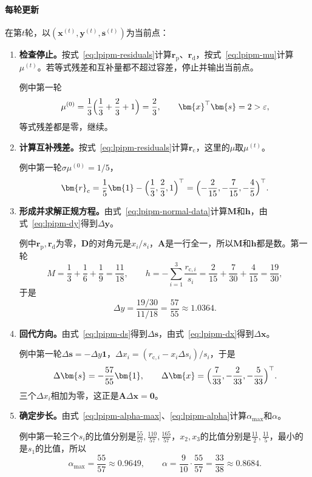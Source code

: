 \paragraph{每轮更新}
在第$t$轮，以$(\bm{x}^{(t)},\bm{y}^{(t)},\bm{s}^{(t)})$为当前点：
\begin{enumerate}
 \item \textbf{检查停止。}按式~\eqref{eq:lpipm-residuals}计算$\bm{r}_{\mathrm{p}}$、$\bm{r}_{\mathrm{d}}$，按式~\eqref{eq:lpipm-mu}计算$\mu^{(t)}$。若等式残差和互补量都不超过容差，停止并输出当前点。

 例中第一轮
 \[
  \mu^{(0)}=\frac13\Bigl(\frac13+\frac23+1\Bigr)=\frac23,\qquad\bm{x}^\top\bm{s}=2>\varepsilon,
 \]
 等式残差都是零，继续。

 \item \textbf{计算互补残差。}按式~\eqref{eq:lpipm-residuals}计算$\bm{r}_{\mathrm{c}}$，这里的$\mu$取$\mu^{(t)}$。

 例中第一轮$\sigma\mu^{(0)}=1/5$，
 \[
  \bm{r}_{\mathrm{c}}=\frac15\bm{1}-\Bigl(\frac13,\frac23,1\Bigr)^\top=\Bigl(-\frac{2}{15},-\frac{7}{15},-\frac45\Bigr)^\top.
 \]

 \item \textbf{形成并求解正规方程。}由式~\eqref{eq:lpipm-normal-data}计算$\bm{M}$和$\bm{h}$，由式~\eqref{eq:lpipm-dy}得到$\Delta\bm{y}$。

 例中$\bm{r}_{\mathrm{p}},\bm{r}_{\mathrm{d}}$为零，$\bm{D}$的对角元是$x_i/s_i$，$\bm{A}$是一行全一，所以$\bm{M}$和$\bm{h}$都是数。第一轮
 \[
  M=\frac13+\frac16+\frac19=\frac{11}{18},\qquad h=-\sum_{i=1}^3\frac{r_{\mathrm{c},i}}{s_i}=\frac{2}{15}+\frac{7}{30}+\frac{4}{15}=\frac{19}{30},
 \]
 于是
 \[
  \Delta y=\frac{19/30}{11/18}=\frac{57}{55}\approx1.0364.
 \]

 \item \textbf{回代方向。}由式~\eqref{eq:lpipm-ds}得到$\Delta\bm{s}$，由式~\eqref{eq:lpipm-dx}得到$\Delta\bm{x}$。

 例中第一轮$\Delta\bm{s}=-\Delta y\bm{1}$，$\Delta x_i=(r_{\mathrm{c},i}-x_i\Delta s_i)/s_i$，于是
 \[
  \Delta\bm{s}=-\frac{57}{55}\bm{1},\qquad
  \Delta\bm{x}=\Bigl(\frac{7}{33},-\frac{2}{33},-\frac{5}{33}\Bigr)^\top.
 \]
 三个$\Delta x_i$相加为零，这正是$\bm{A}\Delta\bm{x}=\bm{0}$。

 \item \textbf{确定步长。}由式~\eqref{eq:lpipm-alpha-max}、\eqref{eq:lpipm-alpha}计算$\alpha_{\max}$和$\alpha$。

 例中第一轮三个$s_i$的比值分别是$\tfrac{55}{57},\tfrac{110}{57},\tfrac{165}{57}$，$x_2,x_3$的比值分别是$\tfrac{11}{2},\tfrac{11}{5}$，最小的是$s_1$的比值，所以
 \[
  \alpha_{\max}=\frac{55}{57}\approx0.9649,\qquad\alpha=\frac{9}{10}\cdot\frac{55}{57}=\frac{33}{38}\approx0.8684.
 \]


\end{enumerate}
